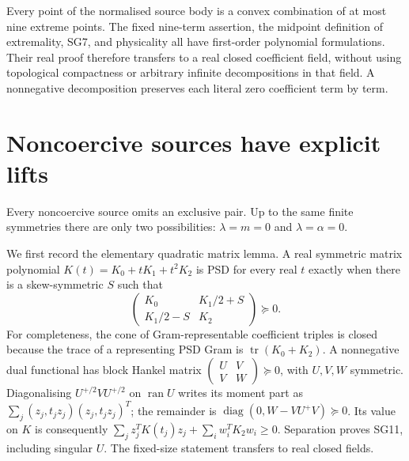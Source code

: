 Every point of the normalised source body is a convex combination
of at most nine extreme points.  The fixed nine-term assertion,
the midpoint definition of extremality, SG7, and physicality all
have first-order polynomial formulations.  Their real proof
therefore transfers to a real closed coefficient field, without
using topological compactness or arbitrary infinite decompositions
in that field.  A nonnegative decomposition preserves each literal
zero coefficient term by term.

\section{Noncoercive sources have explicit lifts}

Every noncoercive source omits an exclusive pair.  Up to the same
finite symmetries there are only two possibilities:
$\lambda=m=0$ and $\lambda=\alpha=0$.

We first record the elementary quadratic matrix lemma.  A real
symmetric matrix polynomial $K(t)=K_0+tK_1+t^2K_2$ is PSD for every
real $t$ exactly when there is a skew-symmetric $S$ such that
\[
 \begin{pmatrix}K_0&K_1/2+S\\K_1/2-S&K_2\end{pmatrix}\succeq0.
                                                               \tag{SG11}
\]
For completeness, the cone of Gram-representable coefficient
triples is closed because the trace of a representing PSD Gram is
$\operatorname{tr}(K_0+K_2)$.  A nonnegative dual functional has
block Hankel matrix $\left(\begin{smallmatrix}U&V\\V&W\end{smallmatrix}\right)
\succeq0$, with $U,V,W$ symmetric.  Diagonalising
$U^{+/2}VU^{+/2}$ on $\operatorname{ran}U$ writes its moment part as
$\sum_j(z_j,t_jz_j)(z_j,t_jz_j)^T$; the remainder is
$\operatorname{diag}(0,W-VU^+V)\succeq0$.
Its value on $K$ is consequently
$\sum_jz_j^TK(t_j)z_j+\sum_iw_i^TK_2w_i\geq0$.
Separation proves SG11, including singular $U$.  The fixed-size
statement transfers to real closed fields.

